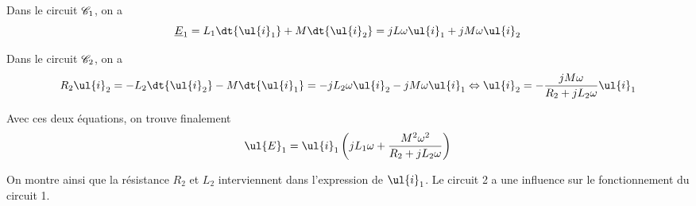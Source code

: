 \documentclass{cours}
\begin{document}
Dans le circuit $\mathscr{C}_1$, on a 
\begin{equation}
  \underline{E}_1  = L_1 \dt{\ul{i}_1} + M \dt{\ul{i}_2} = jL\omega \ul{i}_1 + jM\omega\ul{i}_2
\end{equation}

Dans le circuit $\mathscr{C}_2$, on a
\begin{equation}
  R_2 \ul{i}_2 = -L_2 \dt{\ul{i}_2} - M \dt{\ul{i}_1} = -jL_2\omega \ul{i}_2 - jM\omega\ul{i}_1 \Leftrightarrow \ul{i}_2 = -\frac{jM\omega}{R_2 + jL_2\omega}\ul{i}_1
\end{equation}

Avec ces deux équations, on trouve finalement
\begin{equation}
  \ul{E}_1 = \ul{i}_1 \left( jL_1\omega + \frac{M^2\omega^2}{R_2 + jL_2\omega} \right) 
\end{equation}

On montre ainsi que la résistance $R_2$ et $L_2$  interviennent dans l'expression de $\ul{i}_1$. Le circuit 2 a une influence sur le fonctionnement du circuit 1. 
\end{document}
